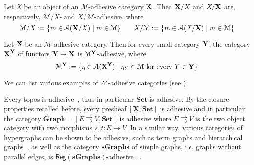 \documentclass[a4paper,UKenglish,cleveref,pdftex,thm-restate,numberwithinsect,anonymous]{lipics}
\newcommand{\reg}{\mathsf{Reg}}
\newcommand{\cat}[1]{\ensuremath{\mathbf{#1}}}
\def\A{\textbf {\textup{A}}}
\def\B{\textbf {\textup{B}}}
\def\C{\textbf {\textup{C}}}
\def\X{\textbf {\textup{X}}}
\def\Y{\textbf {\textup{Y}}}
\newcommand{\comma}[2]{#1\hspace{1pt} {\downarrow}\hspace{1pt} #2}
\newcommand{\cma}[2]{\mathcal{#1}\hspace{1pt} {\downarrow}\hspace{1pt} \mathcal{#2}}
\begin{document}

\begin{theorem}\label{cor:slice}
  Let $X$ be an object of an $\mathcal{M}$-adhesive category
  $\X$. Then $\X/X$ and $X/\X$ are, respectively, $\mathcal{M}/X$-
  and $X/\mathcal{M}$-adhesive, where
  \[\mathcal{M}/X:=\{m\in \mathcal{A}(\X/X) \mid m\in \mathcal{M} \}
    \qquad X/\mathcal{M}:=\{m\in \mathcal{A}(X/\X) \mid m\in
    \mathcal{M} \}
  \]
\end{theorem}


\begin{theorem}
  \label{thm:functors}
  Let $\X$ be an $\mathcal{M}$-adhesive category. Then for every small
  category $\Y$, the category $\X^\Y$ of functors $\Y\to \X$ is
  $\mathcal{M}^{\Y}$-adhesive, where
  \[\mathcal{M}^{\Y}:=\{\eta \in \mathcal{A}(\X^\Y) \mid \eta_Y \in
    \mathcal{M} \text{ for every } Y\in \Y\}\]
\end{theorem}

We can list various examples of $\mathcal{M}$-adhesive categories (see
\cite{castelnovo2023thesis,CastelnovoGM22,lack2006toposes}).


\begin{example}
  \label{ex:adhesive}
  Every topos is adhesive~\cite{lack2006toposes}, thus in particular
  $\cat{Set}$ is adhesive. By the closure properties recalled before,
  every presheaf $[\cat{X},\cat{Set}]$ is adhesive and in particular
  the category $\cat{Graph} = [ E \rightrightarrows V, \cat{Set}]$ is
  adhesive where $E \rightrightarrows {V}$ is the two object category
  with two morphisms $s,t \colon{E} \to {V}$. In a similar way,
  various categories of hypergraphs can be shown to be adhesive, 
  such as term graphs and hierarchical graphs~\cite{CastelnovoGM24},
  as well as the category $\cat{sGraphs}$ of simple graphs, i.e. graphs without
  parallel edges, is $\reg{(\cat{sGraphs})}$-adhesive~\cite{xxx}
.%
\end{example}
\end{document}
